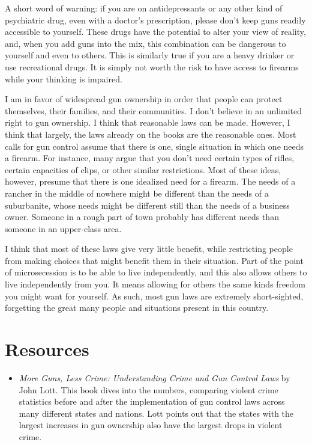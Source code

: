 A short word of warning: if you are on antidepressants or any other kind
of psychiatric drug, even with a doctor’s prescription, please don’t
keep guns readily accessible to yourself. These drugs have the
potential to alter your view of reality, and, when you add guns into
the mix, this combination can be dangerous to yourself and even to
others. This is similarly true if you are a heavy drinker or use
recreational drugs. It is simply not worth the risk to have access to
firearms while your thinking is impaired.

\begin{policynote}
I am in favor of widespread gun ownership in order that people can
protect themselves, their families, and their communities. I don’t
believe in an unlimited right to gun ownership. I think that reasonable
laws can be made. However, I think that largely, the laws already on
the books are the reasonable ones. Most calls for gun control assume
that there is one, single situation in which one needs a firearm. For
instance, many argue that you don’t need certain types of rifles,
certain capacities of clips, or other similar restrictions. Most of
these ideas, however, presume that there is one idealized need for a
firearm. The needs of a rancher in the middle of nowhere might be
different than the needs of a suburbanite, whose needs might be
different still than the needs of a business owner. Someone in a rough
part of town probably has different needs than someone in an
upper-class area.

I think that most of these laws give very little benefit, while
restricting people from making choices that might benefit them in their
situation. Part of the point of microsecession is to be able to live
independently, and this also allows others to live independently from
you. It means allowing for others the same kinds freedom you might want
for yourself. As such, most gun laws are extremely short-sighted,
forgetting the great many people and situations present in this
country.
\end{policynote}

\section{Resources}
\begin{itemize}
\item 
\textit{More Guns, Less Crime: Understanding Crime and Gun
Control Laws} by John Lott.  This book dives into the numbers,
comparing violent crime statistics before and after the implementation
of gun control laws across many different states and nations.  Lott
points out that the states with the largest increases in gun ownership
also have the largest drops in violent crime.
\end{itemize}

